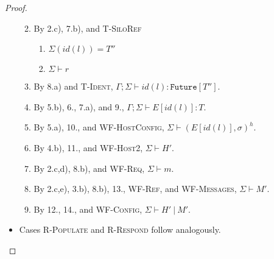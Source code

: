 \begin{proof}
\begin{itemize}
\begin{enumerate}
\begin{enumerate}[label=(\alph*)]
  \end{enumerate}
\item By 2.c), 7.b), and \textsc{T-SiloRef}
  \begin{enumerate}[label=(\alph*)]
  \item $\Sigma(id(l)) = T''$
  \item $\Sigma \vdash r$
  \end{enumerate}
\item By 8.a) and \textsc{T-Ident}, $\Gamma ; \Sigma \vdash id(l) : \texttt{Future}[T'']$.
\item By 5.b), 6., 7.a), and 9., $\Gamma ; \Sigma \vdash E[id(l)] : T$.
\item By 5.a), 10., and \textsc{WF-HostConfig}, $\Sigma \vdash (E[id(l)], \sigma)^h$.
\item By 4.b), 11., and \textsc{WF-Host2}, $\Sigma \vdash H'$.
\item By 2.c,d), 8.b), and \textsc{WF-Req}, $\Sigma \vdash m$.
\item By 2.c,e), 3.b), 8.b), 13., \textsc{WF-Ref}, and \textsc{WF-Messages}, $\Sigma \vdash M'$.
\item By 12., 14., and \textsc{WF-Config}, $\Sigma \vdash H'~|~M'$.
\end{enumerate}

\item Cases \textsc{R-Populate} and \textsc{R-Respond} follow analogously.


\end{itemize}
\end{proof}
